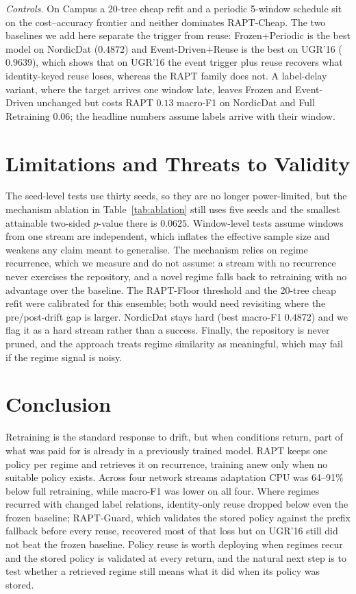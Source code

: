 \emph{Controls.} On Campus a 20-tree cheap refit and a periodic 5-window schedule sit on
the cost--accuracy frontier and neither dominates RAPT-Cheap. The two baselines we add
here separate the trigger from reuse: Frozen+Periodic is the best model on NordicDat
($0.4872$) and Event-Driven+Reuse is the best on UGR'16 ($0.9639$), which shows that on
UGR'16 the event trigger plus reuse recovers what identity-keyed reuse loses, whereas the
RAPT family does not. A label-delay variant, where the target arrives one window late,
leaves Frozen and Event-Driven unchanged but costs RAPT $0.13$ macro-F1 on NordicDat and
Full Retraining $0.06$; the headline numbers assume labels arrive with their window.

\section{Limitations and Threats to Validity}
\label{sec:limitations}
The seed-level tests use thirty seeds, so they are no longer power-limited, but the
mechanism ablation in Table~\ref{tab:ablation} still uses five seeds and the smallest
attainable two-sided $p$-value there is $0.0625$. Window-level tests assume windows from
one stream are independent, which inflates the effective sample size and weakens any claim
meant to generalise. The mechanism relies on regime recurrence, which we measure and do
not assume: a stream with no recurrence never exercises the repository, and a novel regime
falls back to retraining with no advantage over the baseline. The RAPT-Floor threshold and
the 20-tree cheap refit were calibrated for this ensemble; both would need revisiting where
the pre/post-drift gap is larger. NordicDat stays hard (best macro-F1 $0.4872$) and we flag
it as a hard stream rather than a success. Finally, the repository is never pruned, and the
approach treats regime similarity as meaningful, which may fail if the regime signal is
noisy.
\section{Conclusion}
Retraining is the standard response to drift, but when conditions return, part of what was
paid for is already in a previously trained model. RAPT keeps one policy per regime and
retrieves it on recurrence, training anew only when no suitable policy exists. Across four
network streams adaptation CPU was 64--91\% below full retraining, while macro-F1 was lower
on all four. Where regimes recurred with changed label relations, identity-only reuse
dropped below even the frozen baseline; RAPT-Guard, which validates the stored policy
against the prefix fallback before every reuse, recovered most of that loss but on UGR'16
still did not beat the frozen baseline. Policy reuse is worth deploying when regimes recur
and the stored policy is validated at every return, and the natural next step is to test
whether a retrieved regime still means what it did when its policy was stored.

